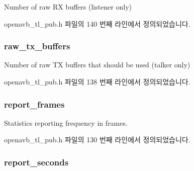 Number of raw RX buffers (listener only) 



openavb\+\_\+tl\+\_\+pub.\+h 파일의 140 번째 라인에서 정의되었습니다.

\subsubsection[{\texorpdfstring{raw\+\_\+tx\+\_\+buffers}{raw_tx_buffers}}]{ raw\+\_\+tx\+\_\+buffers}\hypertarget{structopenavb__tl__cfg__t_add91cb46547dd8e10a83b4807314b515}{}\label{structopenavb__tl__cfg__t_add91cb46547dd8e10a83b4807314b515}


Number of raw TX buffers that should be used (talker only) 



openavb\+\_\+tl\+\_\+pub.\+h 파일의 138 번째 라인에서 정의되었습니다.

\subsubsection[{\texorpdfstring{report\+\_\+frames}{report_frames}}]{ report\+\_\+frames}\hypertarget{structopenavb__tl__cfg__t_a7b201beeb969583c11c16d83be758959}{}\label{structopenavb__tl__cfg__t_a7b201beeb969583c11c16d83be758959}


Statistics reporting frequency in frames. 



openavb\+\_\+tl\+\_\+pub.\+h 파일의 130 번째 라인에서 정의되었습니다.

\subsubsection[{\texorpdfstring{report\+\_\+seconds}{report_seconds}}]{ report\+\_\+seconds}\hypertarget{structopenavb__tl__cfg__t_aa421113dd03391cac7220cd7dd7ee59b}{}\label{structopenavb__tl__cfg__t_aa421113dd03391cac7220cd7dd7ee59b}



